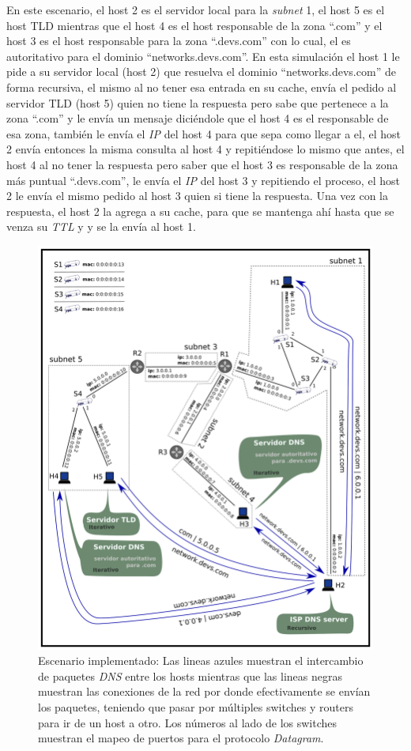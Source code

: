 \documentclass[10pt,a4paper]{article}
\begin{document}
En este escenario, el host 2 es el servidor local para la \textit{subnet} 1, el host 5 es el host TLD mientras que el host 4 es el host responsable de la zona ``.com'' y el host 3 es el host responsable para la zona ``.devs.com'' con lo cual, el es autoritativo para el dominio ``networks.devs.com''. En esta simulación el host 1 le pide a su servidor local (host 2) que resuelva el dominio ``networks.devs.com'' de forma recursiva, el mismo al no tener esa entrada en su cache, envía el pedido al servidor TLD (host 5) quien no tiene la respuesta pero sabe que pertenece a la zona ``.com'' y le envía un mensaje diciéndole que el host 4 es el responsable de esa zona, también le envía el \textit{IP} del host 4 para que sepa como llegar a el, el host 2 envía entonces la misma consulta al host 4 y repitiéndose lo mismo que antes, el host 4 al no tener la respuesta pero saber que el host 3 es responsable de la zona más puntual ``.devs.com'', le envía el \textit{IP} del host 3 y repitiendo el proceso, el host 2 le envía el mismo pedido al host 3 quien si tiene la respuesta. Una vez con la respuesta, el host 2 la agrega a su cache, para que se mantenga ahí hasta que se venza su \textit{TTL} y y se la envía al host 1.

\begin{figure}[!htb]
    \centering
    \includegraphics[width = 1.0\textwidth]{img/png/scenario.png}
    \caption{Escenario implementado: Las lineas azules muestran el intercambio de paquetes \textit{DNS} entre los hosts mientras que las lineas negras muestran las conexiones de la red por donde efectivamente se envían los paquetes, teniendo que pasar por múltiples switches y routers para ir de un host a otro. Los números al lado de los switches muestran el mapeo de puertos para el protocolo \textit{Datagram}.}
    \label{figure: case study}
\end{figure}
\end{document}
